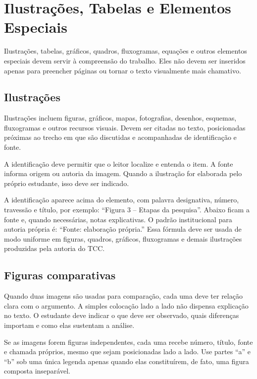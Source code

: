 \chapter{Ilustrações, Tabelas e Elementos Especiais}

Ilustrações, tabelas, gráficos, quadros, fluxogramas, equações e outros elementos especiais devem servir à compreensão do trabalho. Eles não devem ser inseridos apenas para preencher páginas ou tornar o texto visualmente mais chamativo.

\section{Ilustrações}

Ilustrações incluem figuras, gráficos, mapas, fotografias, desenhos, esquemas, fluxogramas e outros recursos visuais. Devem ser citadas no texto, posicionadas próximas ao trecho em que são discutidas e acompanhadas de identificação e fonte.

A identificação deve permitir que o leitor localize e entenda o item. A fonte informa origem ou autoria da imagem. Quando a ilustração for elaborada pelo próprio estudante, isso deve ser indicado.

A identificação aparece acima do elemento, com palavra designativa, número, travessão e título, por exemplo: ``Figura 3 -- Etapas da pesquisa''. Abaixo ficam a fonte e, quando necessárias, notas explicativas. O padrão institucional para autoria própria é: ``Fonte: elaboração própria.'' Essa fórmula deve ser usada de modo uniforme em figuras, quadros, gráficos, fluxogramas e demais ilustrações produzidas pela autoria do TCC.

\decisaoinstitucional

\section{Figuras comparativas}

Quando duas imagens são usadas para comparação, cada uma deve ter relação clara com o argumento. A simples colocação lado a lado não dispensa explicação no texto. O estudante deve indicar o que deve ser observado, quais diferenças importam e como elas sustentam a análise.

Se as imagens forem figuras independentes, cada uma recebe número, título, fonte e chamada próprios, mesmo que sejam posicionadas lado a lado. Use partes ``a'' e ``b'' sob uma única legenda apenas quando elas constituírem, de fato, uma figura composta inseparável.

